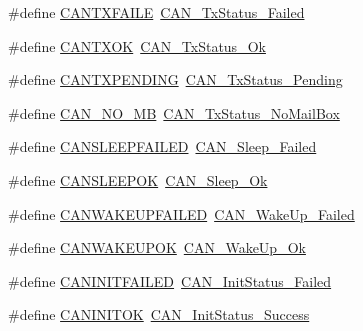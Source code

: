 \begin{DoxyCompactItemize}
\item 
\#define \hyperlink{group___c_a_n___legacy_gae315f7ee14af20ca8454be9e507873cd}{C\+A\+N\+T\+X\+F\+A\+I\+LE}~\hyperlink{group___c_a_n__transmit__constants_ga8d193002e76c04ec8caff6b110cd5983}{C\+A\+N\+\_\+\+Tx\+Status\+\_\+\+Failed}
\item 
\#define \hyperlink{group___c_a_n___legacy_ga288ba42cf1de7572f2fe1378268c9452}{C\+A\+N\+T\+X\+OK}~\hyperlink{group___c_a_n__transmit__constants_ga0b401c61922b1449de9b486dcf475c97}{C\+A\+N\+\_\+\+Tx\+Status\+\_\+\+Ok}
\item 
\#define \hyperlink{group___c_a_n___legacy_ga76f43f4c54505b1f87b39b056ca38897}{C\+A\+N\+T\+X\+P\+E\+N\+D\+I\+NG}~\hyperlink{group___c_a_n__transmit__constants_ga9678a3a51379422868083608c7394409}{C\+A\+N\+\_\+\+Tx\+Status\+\_\+\+Pending}
\item 
\#define \hyperlink{group___c_a_n___legacy_ga418f1fd7ca2e852b263fd07874fde0c6}{C\+A\+N\+\_\+\+N\+O\+\_\+\+MB}~\hyperlink{group___c_a_n__transmit__constants_ga2620e99debd51011d3569121f2e44690}{C\+A\+N\+\_\+\+Tx\+Status\+\_\+\+No\+Mail\+Box}
\item 
\#define \hyperlink{group___c_a_n___legacy_ga4d5e8e0c57febb024b30e5f24866a117}{C\+A\+N\+S\+L\+E\+E\+P\+F\+A\+I\+L\+ED}~\hyperlink{group___c_a_n__sleep__constants_ga169500ab7169c4e9c7e9e4ea34b3e070}{C\+A\+N\+\_\+\+Sleep\+\_\+\+Failed}
\item 
\#define \hyperlink{group___c_a_n___legacy_ga2f8d34f8f60a6c84d8e436d4d37708ab}{C\+A\+N\+S\+L\+E\+E\+P\+OK}~\hyperlink{group___c_a_n__sleep__constants_gaf5c4e9d32d4faff9d0bf61e153ed7998}{C\+A\+N\+\_\+\+Sleep\+\_\+\+Ok}
\item 
\#define \hyperlink{group___c_a_n___legacy_ga0de3b0e2c544d9fa772b646e331e51b1}{C\+A\+N\+W\+A\+K\+E\+U\+P\+F\+A\+I\+L\+ED}~\hyperlink{group___c_a_n__wake__up__constants_ga837fd7ad47fee78e43a186544e2b390b}{C\+A\+N\+\_\+\+Wake\+Up\+\_\+\+Failed}
\item 
\#define \hyperlink{group___c_a_n___legacy_gafed6ab4dbb00c9d63f6a7cdf323f33ef}{C\+A\+N\+W\+A\+K\+E\+U\+P\+OK}~\hyperlink{group___c_a_n__wake__up__constants_ga152e4935cf85bdfb803eb36b656cd690}{C\+A\+N\+\_\+\+Wake\+Up\+\_\+\+Ok}
\item 
\#define \hyperlink{group___c_a_n___legacy_ga0539a9e5a898fcd71c4dcb7e341e4b86}{C\+A\+N\+I\+N\+I\+T\+F\+A\+I\+L\+ED}~\hyperlink{group___c_a_n__sleep__constants_ga095c319e8c54c974eb2b6eeadf180d96}{C\+A\+N\+\_\+\+Init\+Status\+\_\+\+Failed}
\item 
\#define \hyperlink{group___c_a_n___legacy_ga14cba0b5b506be73e2f45c732f8e54cb}{C\+A\+N\+I\+N\+I\+T\+OK}~\hyperlink{group___c_a_n__sleep__constants_ga6bed5957af8f2f6b00568e15ccac5772}{C\+A\+N\+\_\+\+Init\+Status\+\_\+\+Success}

\end{DoxyCompactItemize}
